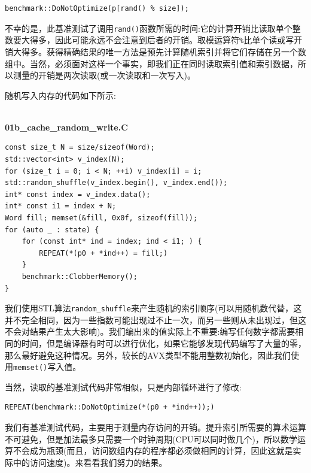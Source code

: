 \begin{lstlisting}[style=styleCXX]
benchmark::DoNotOptimize(p[rand() % size]);
\end{lstlisting}

不幸的是，此基准测试了调用\texttt{rand()}函数所需的时间:它的计算开销比读取单个整数要大得多，因此可能永远不会注意到后者的开销。取模运算符\texttt{\%}比单个读或写开销大得多。获得精确结果的唯一方法是预先计算随机索引并将它们存储在另一个数组中。当然，必须面对这样一个事实，即我们正在同时读取索引值和索引数据，所以测量的开销是两次读取(或一次读取和一次写入)。

随机写入内存的代码如下所示:

\hspace*{\fill} \\ %
\noindent
\textbf{01b\_cache\_random\_write.C}
\begin{lstlisting}[style=styleCXX]
const size_t N = size/sizeof(Word);
std::vector<int> v_index(N);
for (size_t i = 0; i < N; ++i) v_index[i] = i;
std::random_shuffle(v_index.begin(), v_index.end());
int* const index = v_index.data();
int* const i1 = index + N;
Word fill; memset(&fill, 0x0f, sizeof(fill));
for (auto _ : state) {
	for (const int* ind = index; ind < i1; ) {
		REPEAT(*(p0 + *ind++) = fill;)
	}
	benchmark::ClobberMemory();
}
\end{lstlisting}

我们使用STL算法\texttt{random\_shuffle}来产生随机的索引顺序(可以用随机数代替，这并不完全相同，因为一些指数可能出现过不止一次，而另一些则从未出现过，但这不会对结果产生太大影响)。我们编出来的值实际上不重要:编写任何数字都需要相同的时间，但是编译器有时可以进行优化，如果它能够发现代码编写了大量的零，那么最好避免这种情况。另外，较长的AVX类型不能用整数初始化，因此我们使用\texttt{memset()}写入值。

当然，读取的基准测试代码非常相似，只是内部循环进行了修改:

\begin{lstlisting}[style=styleCXX]
REPEAT(benchmark::DoNotOptimize(*(p0 + *ind++));)
\end{lstlisting}

我们有基准测试代码，主要用于测量内存访问的开销。提升索引所需要的算术运算不可避免，但是加法最多只需要一个时钟周期(CPU可以同时做几个)，所以数学运算不会成为瓶颈(而且，访问数组内存的程序都必须做相同的计算，因此这就是实际中的访问速度)。来看看我们努力的结果。




























